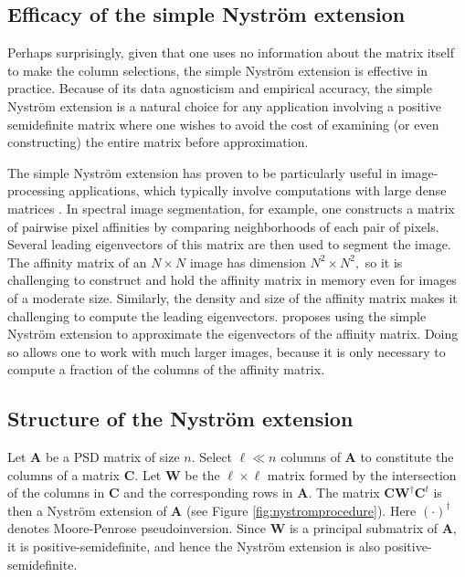 \documentclass[11pt,letterpaper,twoside,reqno,nosumlimits]{amsart}
\newcommand{\mat}[1]{\ensuremath{\bm{#1}}}
\theoremstyle{remark}
\begin{document}
\subsection{Efficacy of the simple Nystr\"om extension}
Perhaps surprisingly, given that one uses no information about the matrix itself to make the column selections, the simple Nystr\"om extension is effective in practice. Because of its data agnosticism and empirical accuracy, the simple Nystr\"om extension is a natural choice for any application involving a positive semidefinite matrix where one wishes to avoid the cost of examining (or even constructing) the entire matrix before approximation. 

The simple Nystr\"om extension has proven to be particularly useful in image-processing applications, which typically involve computations with large dense matrices \cite{BCFM04, WDTLG09, BF11}. In spectral image segmentation, for example, one constructs a matrix of pairwise pixel affinities by comparing neighborhoods of each pair of pixels. Several leading eigenvectors of this matrix are then used to segment the image. The affinity matrix of an $N \times N$ image has dimension $N^2 \times N^2,$ so it is challenging to construct and hold the affinity matrix in memory even for images of a moderate size. Similarly, the density and size of the affinity matrix makes it challenging to compute the leading eigenvectors. \cite{BCFM04} proposes using the simple Nystr\"om extension to approximate the eigenvectors of the affinity matrix. Doing so allows one to work with much larger images, because it is only necessary to compute a fraction of the columns of the affinity matrix.  

\subsection{Structure of the Nystr\"om extension} Let $\mat{A}$ be a PSD matrix of size $n.$ Select $\ell \ll n$ columns of $\mat{A}$ to constitute the columns of a matrix $\mat{C}.$ Let $\mat{W}$ be the $\ell \times \ell$ matrix formed by the intersection of the columns in $\mat{C}$ and the corresponding rows in $\mat{A}.$ The matrix $\mat{C} \mat{W}^\dagger \mat{C}^t$ is then a Nystr\"om extension of $\mat{A}$ (see Figure \ref{fig:nystromprocedure}). Here $(\cdot)^\dagger$ denotes Moore-Penrose pseudoinversion. Since $\mat{W}$ is a principal submatrix of $\mat{A},$ it is positive-semidefinite, and hence the Nystr\"om extension is also positive-semidefinite.
\end{document}
